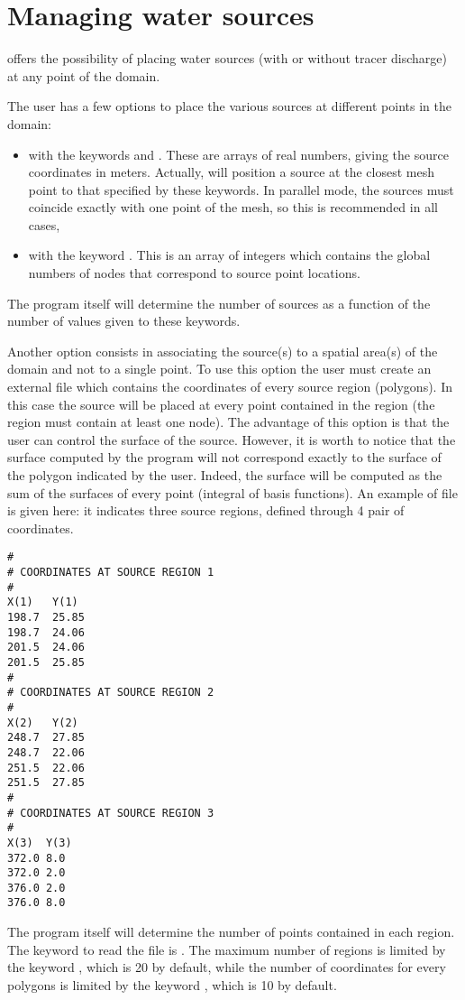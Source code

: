 \chapter{Managing water sources}
\label{ch:manag:ws}
 offers the possibility of placing water sources (with or without
tracer discharge) at any point of the domain.

The user has a few options to place the various sources at different points in
the domain:
\begin{itemize}
\item with the keywords  and
.
These are arrays of real numbers,
giving the source coordinates in meters. Actually,  will position a
source at the closest mesh point to that specified by these keywords.
In parallel mode, the sources must coincide exactly with one point of the mesh,
so this is recommended in all cases,
\item with the keyword . This is an
array of integers which contains the global numbers of nodes that correspond
 to source point locations.
\end{itemize}
The program itself will determine the number of sources as a function of the
number of values given to these keywords.

Another option consists in associating the source(s) to a spatial area(s) of the
domain and not to a single point.
To use this option the user must create an external file which contains the
coordinates of every source region (polygons).
In this case the source will be placed at every point contained in the
region (the region must contain at least one node). The advantage of this option
is that the user can control the surface of the source. However, it is worth to
notice that the surface computed by the program will not correspond exactly to
the surface of the polygon indicated by the user.
Indeed, the surface will be computed as
the sum of the surfaces of every point (integral of basis functions).
An example of file is given here: it indicates three source regions, defined
through 4 pair of coordinates.
\begin{lstlisting}[language=TelemacCas]
#
# COORDINATES AT SOURCE REGION 1
#
X(1)   Y(1)
198.7  25.85
198.7  24.06
201.5  24.06
201.5  25.85
#
# COORDINATES AT SOURCE REGION 2
#
X(2)   Y(2)
248.7  27.85
248.7  22.06
251.5  22.06
251.5  27.85
#
# COORDINATES AT SOURCE REGION 3
#
X(3)  Y(3)
372.0 8.0
372.0 2.0
376.0 2.0
376.0 8.0
\end{lstlisting}
The program itself will determine the number of points contained in each region.
The keyword to read the file is .
The maximum number of regions is limited by the keyword
, which is 20 by default, while the number
of coordinates for every polygons is limited by the keyword
, which is 10 by default.

